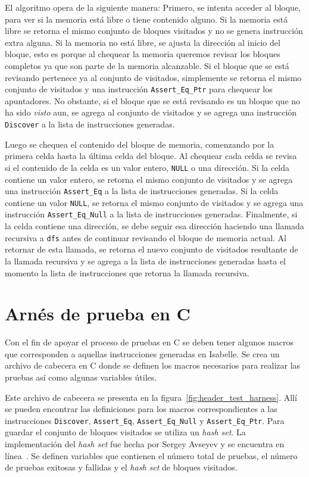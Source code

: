 El algoritmo opera de la siguiente manera:
Primero, se intenta acceder al bloque, para ver si la memoria está libre o tiene contenido alguno.
Si la memoria está libre se retorna el mismo conjunto de bloques visitados y no se genera instrucción extra alguna.
Si la memoria no está libre, se ajusta la dirección al inicio del bloque, esto es porque al chequear la memoria queremos revisar los bloques completos ya que son parte de la memoria alcanzable.
Si el bloque que se está revisando pertenece ya al conjunto de visitados, simplemente se retorna el mismo conjunto de visitados y una instrucción \verb|Assert_Eq_Ptr| para chequear los apuntadores.
No obstante, si el bloque que se está revisando es un bloque que no ha sido \textit{visto} aun, se agrega al conjunto de visitados y se agrega una instrucción \verb|Discover| a la lista de instrucciones generadas.

Luego se chequea el contenido del bloque de memoria, comenzando por la primera celda hasta la última celda del bloque.
Al chequear cada celda se revisa si el contenido de la celda es un valor entero, \verb|NULL| o una dirección.
Si la celda contiene un valor entero, se retorna el mismo conjunto de visitados y se agrega una instrucción \verb|Assert_Eq| a la lista de instrucciones generadas.
Si la celda contiene un valor \verb|NULL|, se retorna el mismo conjunto de visitados y se agrega una instrucción \verb|Assert_Eq_Null| a la lista de instrucciones generadas.
Finalmente, si la celda contiene una dirección, se debe seguir esa dirección haciendo una llamada recursiva a \verb|dfs| antes de continuar revisando el bloque de memoria actual.
Al retornar de esta llamada, se retorna el nuevo conjunto de visitados resultante de la llamada recursiva y se agrega a la lista de instrucciones generadas hasta el momento la lista de instrucciones que retorna la llamada recursiva.


\section{Arnés de prueba en C}

Con el fin de apoyar el proceso de pruebas en C se deben tener algunos macros que corresponden a aquellas instrucciones generadas en Isabelle.
Se crea un archivo de cabecera en C donde se definen los macros necesarios para realizar las pruebas así como algunas variables útiles.

Este archivo de cabecera se presenta en la figura~\ref{fig:header_test_harness}.
Allí se pueden encontrar las definiciones para los macros correspondientes a las instrucciones \verb|Discover|, \verb|Assert_Eq|, \verb|Assert_Eq_Null| y \verb|Assert_Eq_Ptr|.
Para guardar el conjunto de bloques visitados se utiliza un \textit{hash set}.
La implementación del \textit{hash set} fue hecha por Sergey Avseyev y se encuentra en línea~\cite{hashset}.
Se definen variables que contienen el número total de pruebas, el número de pruebas exitosas y fallidas y el \textit{hash set} de bloques visitados.


